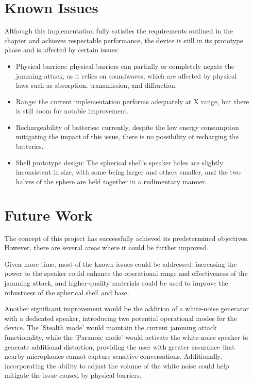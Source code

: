 \section{Known Issues}
Although this implementation fully satisfies the requirements outlined in the  chapter and achieves respectable performance, the device is still in its prototype phase and is affected by certain issues:
\begin{itemize}
    \item Physical barriers: physical barriers can partially or completely negate the jamming attack, as it relies on soundwaves, which are affected by physical laws such as absorption, transmission, and diffraction.
    \item Range: the current implementation performs adequately at X range, but there is still room for notable improvement.
    \item Rechargeability of batteries: currently, despite the low energy consumption mitigating the impact of this issue, there is no possibility of recharging the batteries.
    \item Shell prototype design: The spherical shell's speaker holes are slightly inconsistent in size, with some being larger and others smaller, and the two halves of the sphere are held together in a rudimentary manner.
\end{itemize}
\section{Future Work}
The concept of this project has successfully achieved its predetermined objectives. 
However, there are several areas where it could be further improved. 

Given more time, most of the known issues could be addressed: increasing the power to the speaker could enhance the operational range and effectiveness of the jamming attack, and higher-quality materials could be used to improve the robustness of the spherical shell and base.

Another significant improvement would be the addition of a white-noise generator with a dedicated speaker, introducing two potential operational modes for the device. 
The 'Stealth mode' would maintain the current jamming attack functionality, while the 'Paranoic mode' would activate the white-noise speaker to generate additional distortion, providing the user with greater assurance that nearby microphones cannot capture sensitive conversations.
Additionally, incorporating the ability to adjust the volume of the white noise could help mitigate the issue caused by physical barriers.